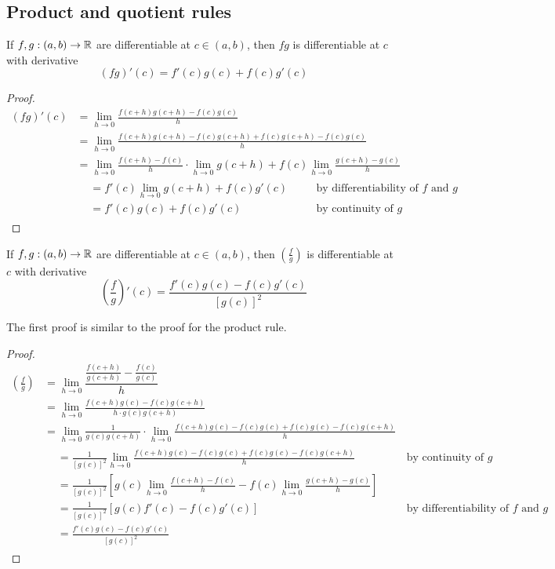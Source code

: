 \subsection{Product and quotient rules}
\begin{theorem}
  If $f, g: (a, b) \to \mathbb{R}$ are differentiable at $c \in (a, b)$, then $fg$ is differentiable at $c$ with derivative 
  \[
    (fg)'(c) = f'(c)g(c) + f(c)g'(c)
  \]
\end{theorem}
\begin{proof}
  \begin{align*}
    (fg)'(c) &= \lim_{h \to 0} \frac{f(c + h)g(c + h) - f(c)g(c)}{h} \\ 
    &= \lim_{h \to 0} \frac{f(c + h)g(c + h) - f(c)g(c + h) + f(c)g(c + h) - f(c)g(c)}{h} \\ 
    &= \lim_{h \to 0} \frac{f(c + h) - f(c)}{h} \cdot \lim_{h \to 0} g(c + h) + f(c) \lim_{h \to 0} \frac{g(c + h) - g(c)}{h} \\ 
    &\begin{aligned}
    &= f'(c) \lim_{h \to 0} g(c + h) + f(c)g'(c) &&\quad \text{by differentiability of $f$ and $g$} \\
    &= f'(c)g(c) + f(c)g'(c) &&\quad \text{by continuity of $g$}
    \end{aligned}
  \end{align*}
\end{proof}
\begin{theorem}
  If $f, g: (a, b) \to \mathbb{R}$ are differentiable at $c \in (a, b)$, then $\left(\frac{f}{g}\right)$ is differentiable at $c$ with derivative 
  \[
    \left(\frac{f}{g}\right)'(c) = \frac{f'(c)g(c) - f(c)g'(c)}{[g(c)] ^ 2}
  \]
\end{theorem}
The first proof is similar to the proof for the product rule.
\begin{proof}
  \begin{align*}
    \left(\frac{f}{g}\right) &= \lim_{h \to 0} \dfrac{\frac{f(c + h)}{g(c + h)} - \frac{f(c)}{g(c)}}{h} \\ 
    &= \lim_{h \to 0} \frac{f(c + h)g(c) - f(c)g(c + h)}{h \cdot g(c)g(c + h)} \\ 
    &= \lim_{h \to 0} \frac{1}{g(c)g(c + h)} \cdot \lim_{h \to 0} \frac{f(c + h)g(c) - f(c)g(c) + f(c)g(c) - f(c)g(c + h)}{h} \\ 
    &\begin{aligned}
      &= \frac{1}{[g(c)] ^ 2} \lim_{h \to 0} \frac{f(c + h)g(c) - f(c)g(c) + f(c)g(c) - f(c)g(c + h)}{h} &&\quad \text{by continuity of $g$} \\ 
      &= \frac{1}{[g(c)] ^ 2} \left[g(c) \lim_{h \to 0} \frac{f(c + h) - f(c)}{h} - f(c) \lim_{h \to 0} \frac{g(c + h) - g(c)}{h}\right] \\ 
      &= \frac{1}{[g(c)] ^ 2} \left[g(c)f'(c) - f(c)g'(c)\right] &&\quad \text{by differentiability of $f$ and $g$} \\ 
      &= \frac{f'(c)g(c) - f(c)g'(c)}{[g(c)] ^ 2}
    \end{aligned}
  \end{align*}
\end{proof}
